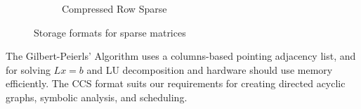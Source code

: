 \begin{figure}[H]
\begin{subfigure}[b]{0.49\textwidth}
        \centering
        \caption{Compressed Row Sparse}
        \label{fig:sparseDS:ccs}
    \end{subfigure}
    \caption{Storage formats for sparse matrices}
    \label{fig:sparseDS:formatsExample}
\end{figure}
The Gilbert-Peierls’ Algorithm uses a columns-based pointing adjacency list, and for solving $Lx=b$ and LU decomposition and hardware should use memory efficiently. The CCS format suits our requirements for creating directed acyclic graphs, symbolic analysis, and scheduling.